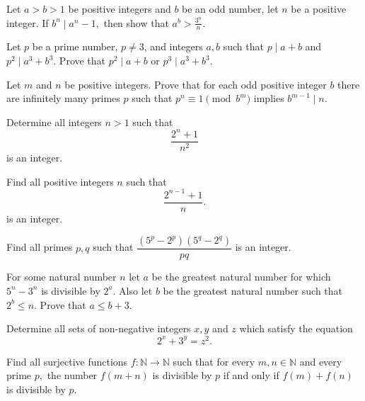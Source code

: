\documentclass[problems.tex]{subfile}
\begin{document}
	\begin{problem} 
		Let $ a > b > 1$ be positive integers and $b$ be an odd number, let $ n$ be a positive integer. If $ b^n \mid a^n-1,$ then show that $ a^b > \frac {3^n}{n}.$
	\end{problem} 
	
	\begin{problem} 
		Let $ p$ be a prime number, $ p\neq 3$, and integers $ a,b$ such that $ p\mid a + b$ and $ p^2 \mid a^3 + b^3$. Prove that $ p^2 \mid a + b$ or $ p^3 \mid a^3 + b^3$.
	\end{problem}
	
	\begin{problem}
		Let $m$ and $n$ be positive integers. Prove that for each odd positive integer $b$ there are infinitely many primes $p$ such that $p^n \equiv 1 \pmod{b^m}$ implies $b^{m-1} \mid n.$
	\end{problem}
	
	\begin{problem}[IMO 1990]
		Determine all integers $ n > 1$ such that
		\[ \frac {2^n + 1}{n^2}\]
		is an integer.
	\end{problem}
	
	\begin{problem}
		Find all positive integers $n$ such that
		\[\frac{2^{n-1}+1}{n}.\]
		is an integer.
	\end{problem}
	
	\begin{problem}
		Find all primes $p,q$ such that $\dfrac{(5^p-2^p)(5^q-2^q)}{pq}$ is an integer.
	\end{problem}
	
	\begin{problem}
		For some natural number $n$ let $a$ be the greatest natural number for which $5^{n}-3^{n}$ is divisible by $2^{a}$. Also let $b$ be the greatest natural number such that $2^{b} \leq n$. Prove that $a \leq b+3$.
	\end{problem}
	
	
	\begin{problem}
		Determine all sets of non-negative integers $ x, y$ and $ z$ which satisfy the equation 
		\[
		2^{x}+3^{y}=z^{2}.
		\]
	\end{problem}
	
	\begin{problem}
		Find all surjective functions $ f: \mathbb{N} \to \mathbb{N}$ such that for every $ m,n \in \mathbb{N}$ and every prime $ p,$ the number $ f(m + n)$ is divisible by $ p$ if and only if $ f(m)+ f(n)$ is divisible by $ p.$
	\end{problem}
	
\end{document}
